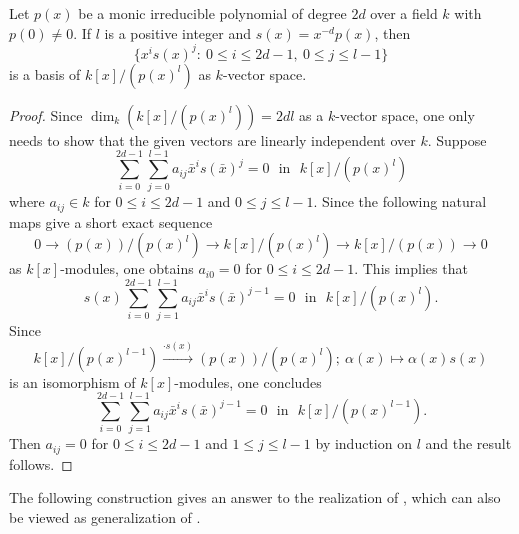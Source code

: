 \documentclass[12pt]{amsart}
\begin{document}
\begin{lem}\label{basis} Let $p(x)$ be a monic irreducible polynomial of degree $2d$ over a field $k$ with $p(0)\neq 0$.  If $l$ is a positive integer and $s(x)=x^{-d}p(x)$, then $$\{ x^i s(x)^j : \ 0\leq i \leq 2d-1, \ 0\leq j \leq l-1 \} $$
is a basis of $k[x]/(p(x)^l)$ as $k$-vector space.  
\end{lem}

\begin{proof}  Since $\dim_k(k[x]/(p(x)^l))=2dl$ as a $k$-vector space, one only needs to show that the given vectors are linearly independent over $k$.  Suppose 
$$ \sum_{i=0}^{2d-1} \sum_{j=0}^{l-1} a_{ij} \bar x^i s(\bar x)^j = 0  \ \ \ \text{in} \ \ \ k[x]/(p(x)^l) $$  
where $a_{ij}\in k$ for $0\leq i \leq 2d-1$ and $ 0\leq j \leq l-1$. Since  the following natural maps give a short exact sequence 
$$ 0\longrightarrow (p(x))/(p(x)^l) \longrightarrow k[x]/(p(x)^l) \longrightarrow k[x]/(p(x)) \longrightarrow 0$$ as $k[x]$-modules, one obtains $a_{i0}=0$ for $0\leq i\leq 2d-1$. This implies that 
$$ s(x) \sum_{i=0}^{2d-1} \sum_{j=1}^{l-1} a_{ij} \bar x^i s(\bar x)^{j-1} =0 \ \ \ \text{in} \ \ \ k[x]/(p(x)^l) . $$
Since 
$$ k[x]/(p(x)^{l-1})  \xrightarrow {\cdot s(x)} (p(x))/(p(x)^l) ; \ \alpha(x) \mapsto \alpha(x) s(x) $$ is an isomorphism of $k[x]$-modules, one concludes 
$$ \sum_{i=0}^{2d-1} \sum_{j=1}^{l-1} a_{ij} \bar x^i s(\bar x)^{j-1} =0 \ \ \ \text{in} \ \ \ k[x]/(p(x)^{l-1}) . $$ Then $a_{ij}=0$ for $0\leq i \leq 2d-1$ and $ 1\leq j \leq l-1$ by induction on $l$ and the result follows. 
\end{proof}

The following construction gives an answer to the realization of  \cite[Theorem 3.3]{Mil}, which can also be viewed as generalization of \cite[Lemma 1.2]{Mil}.
\end{document}
